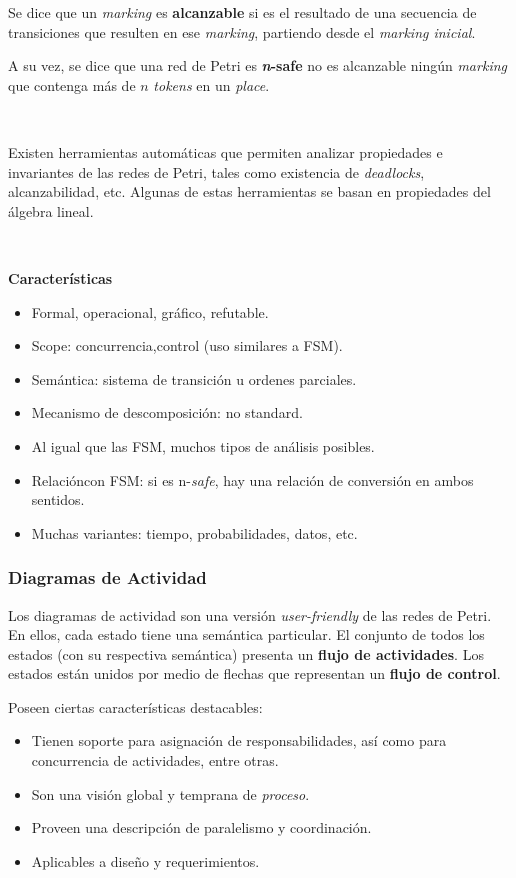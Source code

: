 \documentclass[]{article}
\begin{document}
Se dice que un \textit{marking} es \textbf{alcanzable} si es el resultado de una secuencia de transiciones que resulten en ese \textit{marking}, partiendo desde el \textit{marking inicial}.

A su vez, se dice que una red de Petri es \textbf{\textit{n}-safe} no es alcanzable ningún \textit{marking} que contenga más de $n$ \textit{tokens} en un \textit{place}.

~\newline

Existen herramientas automáticas que permiten analizar propiedades e invariantes de las redes de Petri, tales como existencia de \textit{deadlocks}, alcanzabilidad, etc. Algunas de estas herramientas se basan en propiedades del álgebra lineal.

~\newline

\textbf{Características}
\begin{itemize}
	\item Formal, operacional, gráfico, refutable.
	\item Scope: concurrencia,control (uso similares a FSM).
	\item Semántica: sistema de transición u ordenes parciales.
	\item Mecanismo de descomposición: no standard.
	\item Al igual que las FSM, muchos tipos de análisis posibles.
	\item Relacióncon FSM: si es n-\textit{safe}, hay una relación de conversión en ambos sentidos.
	\item Muchas variantes: tiempo, probabilidades, datos, etc.
\end{itemize}

\subsubsection{Diagramas de Actividad}
Los diagramas de actividad son una versión \textit{user-friendly} de las redes de Petri. En ellos, cada estado tiene una semántica particular. El conjunto de todos los estados (con su respectiva semántica) presenta un \textbf{flujo de actividades}. Los estados están unidos por medio de flechas que representan un \textbf{flujo de control}.

Poseen ciertas características destacables:
\begin{itemize}
	\item Tienen soporte para asignación de responsabilidades, así como para concurrencia de actividades, entre otras.
	\item Son una visión global y temprana de \textit{proceso}.
	\item Proveen una descripción de paralelismo y coordinación.
	\item Aplicables a diseño y requerimientos.
\end{itemize}
\end{document}
